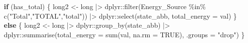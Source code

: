 \documentclass[
  english,
  letterpaper,
  DIV=11,
  numbers=noendperiod]{scrartcl}
\newenvironment{Shaded}{\begin{snugshade}}{\end{snugshade}}
\newcommand{\AttributeTok}[1]{\textcolor[rgb]{0.40,0.45,0.13}{#1}}
\newcommand{\ConstantTok}[1]{\textcolor[rgb]{0.56,0.35,0.01}{#1}}
\newcommand{\ControlFlowTok}[1]{\textcolor[rgb]{0.00,0.23,0.31}{\textbf{#1}}}
\newcommand{\FunctionTok}[1]{\textcolor[rgb]{0.28,0.35,0.67}{#1}}
\newcommand{\NormalTok}[1]{\textcolor[rgb]{0.00,0.23,0.31}{#1}}
\newcommand{\OtherTok}[1]{\textcolor[rgb]{0.00,0.23,0.31}{#1}}
\newcommand{\SpecialCharTok}[1]{\textcolor[rgb]{0.37,0.37,0.37}{#1}}
\newcommand{\StringTok}[1]{\textcolor[rgb]{0.13,0.47,0.30}{#1}}
\begin{document}
\begin{Shaded}
\begin{Highlighting}[]
  \ControlFlowTok{if}\NormalTok{ (has\_total) \{}
\NormalTok{    long2 }\OtherTok{\textless{}{-}}\NormalTok{ long }\SpecialCharTok{|\textgreater{}}
\NormalTok{      dplyr}\SpecialCharTok{::}\FunctionTok{filter}\NormalTok{(Energy\_Source }\SpecialCharTok{\%in\%} \FunctionTok{c}\NormalTok{(}\StringTok{"Total"}\NormalTok{,}\StringTok{"TOTAL"}\NormalTok{,}\StringTok{"total"}\NormalTok{)) }\SpecialCharTok{|\textgreater{}}
\NormalTok{      dplyr}\SpecialCharTok{::}\FunctionTok{select}\NormalTok{(state\_abb, }\AttributeTok{total\_energy =}\NormalTok{ val)}
\NormalTok{  \} }\ControlFlowTok{else}\NormalTok{ \{}
\NormalTok{    long2 }\OtherTok{\textless{}{-}}\NormalTok{ long }\SpecialCharTok{|\textgreater{}}
\NormalTok{      dplyr}\SpecialCharTok{::}\FunctionTok{group\_by}\NormalTok{(state\_abb) }\SpecialCharTok{|\textgreater{}}
\NormalTok{      dplyr}\SpecialCharTok{::}\FunctionTok{summarise}\NormalTok{(}\AttributeTok{total\_energy =} \FunctionTok{sum}\NormalTok{(val, }\AttributeTok{na.rm =} \ConstantTok{TRUE}\NormalTok{), }\AttributeTok{.groups =} \StringTok{"drop"}\NormalTok{)}
\NormalTok{  \}}


\end{Highlighting}
\end{Shaded}
\end{document}

